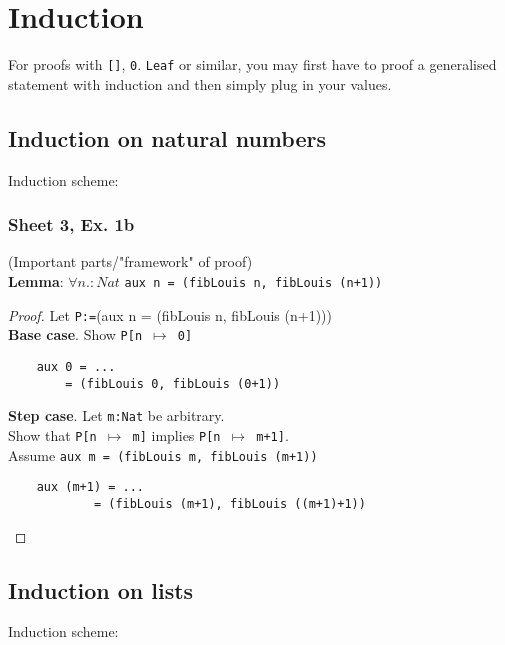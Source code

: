 \documentclass[12pt]{article}
\def\fan{\forall n. : Nat}
\begin{document}
\section{Induction}
For proofs with \texttt{[]}, \texttt{0}. \texttt{Leaf} or similar, you may first have to proof a generalised statement with 
induction and then simply plug in your values.
\subsection{Induction on natural numbers}
Induction scheme:
\begin{prooftree}
\end{prooftree}

\subsubsection{Sheet 3, Ex. 1b}
(Important parts/"framework" of proof) \\
\textbf{Lemma}: $\fan$ \texttt{aux n = (fibLouis n, fibLouis (n+1))}
\begin{proof}
    Let \texttt{P:=}(aux n = (fibLouis n, fibLouis (n+1)))\\
    \textbf{Base case}. Show \texttt{P[n $\mapsto$ 0]} 
    \begin{verbatim}
    aux 0 = ...
        = (fibLouis 0, fibLouis (0+1))
    \end{verbatim}
    \textbf{Step case}. Let \texttt{m:Nat} be arbitrary. \\
    Show that \texttt{P[n $\mapsto$ m]} implies \texttt{P[n $\mapsto$ m+1]}. \\
    Assume \texttt{aux m = (fibLouis m, fibLouis (m+1))}
    \begin{verbatim}
    aux (m+1) = ...
            = (fibLouis (m+1), fibLouis ((m+1)+1)) 
    \end{verbatim}
\end{proof}

\subsection{Induction on lists}

Induction scheme:
\begin{prooftree}
\end{prooftree}
\end{document}
